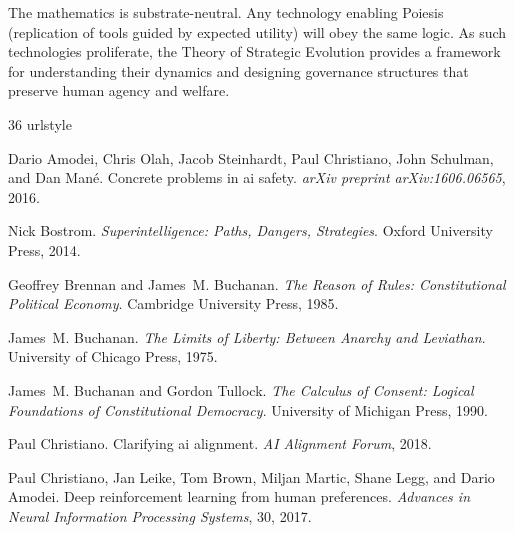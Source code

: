 \documentclass[12pt]{article}
\begin{document}
The mathematics is substrate-neutral. Any technology enabling Poiesis (replication of tools guided by expected utility) will obey the same logic. As such technologies proliferate, the Theory of Strategic Evolution provides a framework for understanding their dynamics and designing governance structures that preserve human agency and welfare.


\clearpage
\begin{thebibliography}{36}
\providecommand{\natexlab}[1]{#1}
\providecommand{\url}[1]{\texttt{#1}}
\expandafter\ifx\csname urlstyle\endcsname\relax
  \providecommand{\doi}[1]{doi: #1}\else
  \providecommand{\doi}{doi: \begingroup \urlstyle{rm}\Url}\fi

Dario Amodei, Chris Olah, Jacob Steinhardt, Paul Christiano, John Schulman, and
  Dan Man{\'e}.
\newblock Concrete problems in ai safety.
\newblock \emph{arXiv preprint arXiv:1606.06565}, 2016.

Nick Bostrom.
\newblock \emph{Superintelligence: Paths, Dangers, Strategies}.
\newblock Oxford University Press, 2014.

Geoffrey Brennan and James~M. Buchanan.
\newblock \emph{The Reason of Rules: Constitutional Political Economy}.
\newblock Cambridge University Press, 1985.

James~M. Buchanan.
\newblock \emph{The Limits of Liberty: Between Anarchy and Leviathan}.
\newblock University of Chicago Press, 1975.

James~M. Buchanan and Gordon Tullock.
\newblock \emph{The Calculus of Consent: Logical Foundations of Constitutional
  Democracy}.
\newblock University of Michigan Press, 1990.

Paul Christiano.
\newblock Clarifying ai alignment.
\newblock \emph{AI Alignment Forum}, 2018.

Paul Christiano, Jan Leike, Tom Brown, Miljan Martic, Shane Legg, and Dario
  Amodei.
\newblock Deep reinforcement learning from human preferences.
\newblock \emph{Advances in Neural Information Processing Systems}, 30, 2017.


\end{thebibliography}
\end{document}

